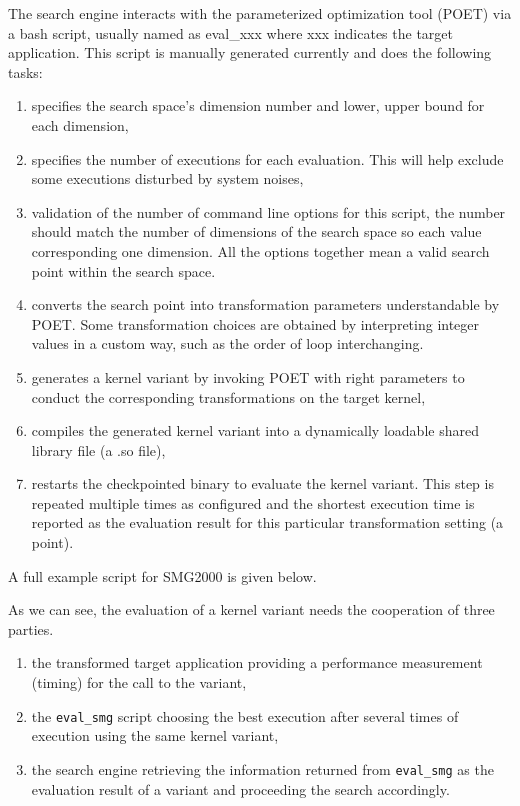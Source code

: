 The search engine interacts with the parameterized optimization tool (POET)
via a bash script, usually named as eval\_xxx where xxx indicates the
target application.
This script is manually generated currently and does the following tasks:
\begin{enumerate}
   \item specifies the search space's dimension number and lower, upper bound
         for each dimension,
   \item specifies the number of executions for each evaluation. This will
         help exclude some executions disturbed by system noises, 
   \item validation of the number of command line options for this script, the
         number should match the number of dimensions of the search space so each
         value corresponding one dimension. All the options together mean a valid
         search point within the search space.
   \item converts the search point into transformation parameters
         understandable by POET. Some transformation choices are obtained by
         interpreting integer values in a custom way, such as the order of loop interchanging. 
   \item generates a kernel variant by invoking POET with right parameters to conduct the
         corresponding transformations on the target kernel,
   \item compiles the generated kernel variant into a dynamically loadable
         shared library file (a .so file),
   \item restarts the checkpointed binary to evaluate the kernel variant. This step is
         repeated multiple times as configured and the shortest execution time is reported as
         the evaluation result for this particular transformation setting (a point).
\end{enumerate}

A full example script for SMG2000 is given below.
\lstset{basicstyle=\scriptsize}

\lstset{basicstyle=\small}

As we can see, the evaluation of a kernel variant needs the cooperation of
three parties.
\begin{enumerate}
   \item the transformed target application providing a performance
         measurement (timing) for the call to the variant, 
   \item the \lstinline{eval_smg} script choosing the best execution after
         several times of execution using the same kernel variant,
   \item the search engine retrieving the information returned from
         \lstinline{eval_smg} as the evaluation result of a variant and proceeding
         the search accordingly.
\end{enumerate}

